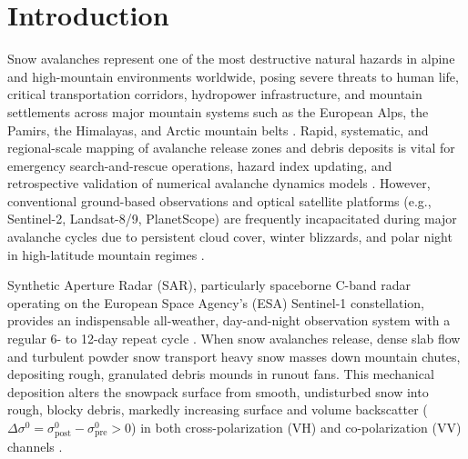 \section{Introduction}
\label{sec:intro}

Snow avalanches represent one of the most destructive natural hazards in alpine and high-mountain environments worldwide, posing severe threats to human life, critical transportation corridors, hydropower infrastructure, and mountain settlements across major mountain systems such as the European Alps, the Pamirs, the Himalayas, and Arctic mountain belts \citep{buehler2019automated, eckerstorfer2017remote, eaws2022size, techel2018spatial}. Rapid, systematic, and regional-scale mapping of avalanche release zones and debris deposits is vital for emergency search-and-rescue operations, hazard index updating, and retrospective validation of numerical avalanche dynamics models \citep{tompkin2021backscatter, muller2021synthetic}. However, conventional ground-based observations and optical satellite platforms (e.g., Sentinel-2, Landsat-8/9, PlanetScope) are frequently incapacitated during major avalanche cycles due to persistent cloud cover, winter blizzards, and polar night in high-latitude mountain regimes \citep{eckerstorfer2019near, vickers2016method}.

Synthetic Aperture Radar (SAR), particularly spaceborne C-band radar operating on the European Space Agency's (ESA) Sentinel-1 constellation, provides an indispensable all-weather, day-and-night observation system with a regular 6- to 12-day repeat cycle \citep{eckerstorfer2017remote, small2011flattening}. When snow avalanches release, dense slab flow and turbulent powder snow transport heavy snow masses down mountain chutes, depositing rough, granulated debris mounds in runout fans. This mechanical deposition alters the snowpack surface from smooth, undisturbed snow into rough, blocky debris, markedly increasing surface and volume backscatter ($\Delta \sigma^0 = \sigma^0_{\text{post}} - \sigma^0_{\text{pre}} > 0$) in both cross-polarization (VH) and co-polarization (VV) channels \citep{tompkin2021backscatter}.

